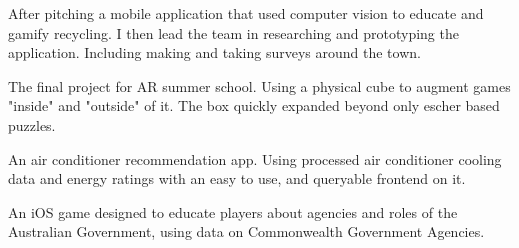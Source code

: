 \documentclass[a4paper]{deedy-resume} %
\begin{document}
\begin{minipage}[t]{0.66\textwidth}
\sectionspace %


After pitching a mobile application that used computer vision to educate and gamify recycling. %
I then lead the team in researching and prototyping the application.
Including making and taking surveys around the town. %

\sectionspace %



The final project for AR summer school. Using a physical cube to augment games "inside" and "outside" of it. The box quickly expanded beyond only escher based puzzles.%

\sectionspace %



An air conditioner recommendation app. Using processed air conditioner cooling data and energy ratings with an easy to use, and queryable frontend on it.

\sectionspace %



An iOS game designed to educate players about agencies and roles of the Australian Government, using data on Commonwealth Government Agencies.


\end{minipage}
\end{document}
